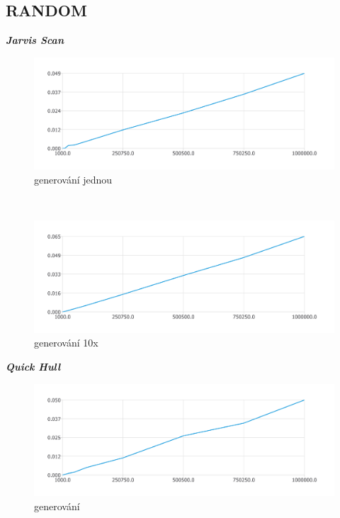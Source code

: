 \documentclass{article}
\begin{document}
\subsection{RANDOM}
\textit{\textbf {Jarvis Scan}}
\\
\begin{figure}[htbp]
\centering
        \includegraphics[clip, trim=0cm 0cm 0cm 0cm, width=1\textwidth]{pdf1.pdf}
        \caption{generování jednou}
\end{figure}
\\
\begin{figure}[htbp]
\centering
        \includegraphics[clip, trim=0cm 0cm 0cm 0cm, width=1\textwidth]{ranj.pdf}
        \caption{generování 10x}
\end{figure}
\clearpage
\newpage
\textit{\textbf {Quick Hull}}
\\
\begin{figure}[htbp]
\centering
        \includegraphics[clip, trim=0cm 0cm 0cm 0cm, width=1\textwidth]{pdf4.pdf}
        \caption{generování}
\end{figure}
\end{document}
